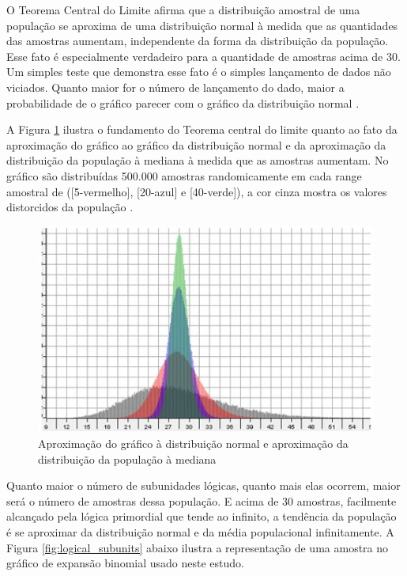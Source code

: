O Teorema Central do Limite afirma que a distribuição amostral de uma população se aproxima de uma distribuição normal à medida que as quantidades das amostras aumentam, independente da forma da distribuição da população. Esse fato é especialmente verdadeiro para a quantidade de amostras acima de 30. Um simples teste que demonstra esse fato é o simples lançamento de dados não viciados. Quanto maior for o número de lançamento do dado, maior a probabilidade de o gráfico parecer com o gráfico da distribuição normal \cite{statisticshowto_teorema_central_limite}.

A Figura \ref{fig:statisticsbyjim_central_limit_theorem} ilustra o fundamento do Teorema central do limite quanto ao fato da aproximação do gráfico ao gráfico da distribuição normal e da aproximação da distribuição da população à mediana à medida que as amostras aumentam. No gráfico são distribuídas 500.000 amostras randomicamente em cada range amostral de ([5-vermelho], [20-azul] e [40-verde]), a cor cinza mostra os valores distorcidos da população \cite{statisticsbyjim_central_limite_theorem_explainded}.

\begin{figure}[H]
\caption{Aproximação do gráfico à distribuição normal e aproximação da distribuição da população à mediana}
\label{fig:statisticsbyjim_central_limit_theorem}
\centering
\includegraphics[scale=1]{sections/images/statisticsbyjim_central_limit_theorem.jpg}
\end{figure}

Quanto maior o número de subunidades lógicas, quanto mais elas ocorrem, maior será o número de amostras dessa população. E acima de 30 amostras, facilmente alcançado pela lógica primordial que tende ao infinito, a tendência da população é se aproximar da distribuição normal e da média populacional infinitamente. A Figura \ref{fig:logical_subunits} abaixo ilustra a representação de uma amostra no gráfico de expansão binomial usado neste estudo.

